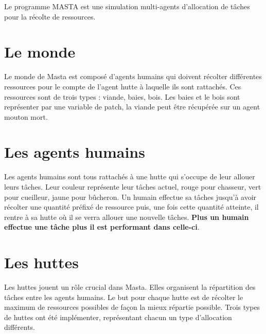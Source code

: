 

Le programme MASTA est une simulation multi-agents d'allocation de
tâches pour la récolte de ressources. 

\section{Le monde}

Le monde de Masta est composé d'agents humains qui doivent récolter
différentes ressources pour le compte de l'agent hutte à laquelle ils sont
rattachés. Ces ressources sont de trois types : viande, baies,
bois. Les baies et le bois sont représenter par une variable
de \og{}patch\fg{}, la viande peut être récupérée sur un agent mouton mort. 


\section{Les agents humains}

Les agents humains sont tous rattachés à une hutte qui s'occupe de
leur allouer leurs tâches. Leur couleur représente leur tâches actuel,
rouge pour chasseur, vert pour cueilleur, jaune pour bûcheron. Un
humain effectue sa tâches jusqu'à avoir récolter une quantité préfixé
de ressource puis, une fois cette quantité atteinte, il rentre à sa
hutte où il se verra allouer une nouvelle tâches. {\bf Plus un
humain effectue une tâche plus il est performant dans celle-ci}.

\section{Les huttes}

Les huttes jouent un rôle crucial dans Masta. Elles organisent la
répartition des tâches entre les agents humains. Le but pour
chaque hutte est de récolter le maximum de ressources possibles de
façon la mieux répartie possible. Trois types de huttes ont été
implémenter, représentant chacun un type d'allocation différents.

